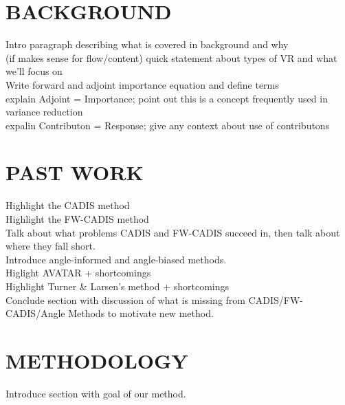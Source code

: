 \documentclass[12pt]{article}
\begin{document}
%
\section{BACKGROUND}
\label{sect::second}

Intro paragraph describing what is covered in background and why\\
(if makes sense for flow/content) quick statement about types of VR and what we'll focus on\\
Write forward and adjoint importance equation and define terms\\
explain Adjoint = Importance; point out this is a concept frequently used in variance reduction \\
expalin Contributon = Response; give any context about use of contributons \\

\section{PAST WORK}
\label{sec::past}
Highlight the CADIS method \\
Highlight the FW-CADIS method \\
Talk about what problems CADIS and FW-CADIS succeed in, then talk about where they fall short. \\
Introduce angle-informed and angle-biased methods. \\
Higlight AVATAR + shortcomings \\
Highlight Turner \& Larsen's method + shortcomings\\
Conclude section with discussion of what is missing from CADIS/FW-CADIS/Angle Methods to motivate new method. \\

%
\section{METHODOLOGY}
\label{sect::methodology}

Introduce section with goal of our method. \\

%
\end{document}

